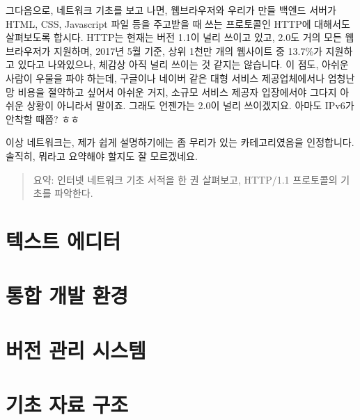 \documentclass[11pt,a4paper]{article}
\begin{document}
그다음으로, 네트워크 기초를 보고 나면, 웹브라우저와 우리가 만들 백엔드 서버가 HTML, CSS, Javascript 파일 등을 주고받을 때 쓰는 프로토콜인 HTTP에 대해서도 살펴보도록 합시다. HTTP는 현재는 버전 1.1이 널리 쓰이고 있고, 2.0도 거의 모든 웹브라우저가 지원하며, 2017년 5월 기준, 상위 1천만 개의 웹사이트 중 13.7\%가 지원하고 있다고 나와있으나, 체감상 아직 널리 쓰이는 것 같지는 않습니다. 이 점도, 아쉬운 사람이 우물을 파야 하는데, 구글이나 네이버 같은 대형 서비스 제공업체에서나 엄청난 망 비용을 절약하고 싶어서 아쉬운 거지, 소규모 서비스 제공자 입장에서야 그다지 아쉬운 상황이 아니라서 말이죠. 그래도 언젠가는 2.0이 널리 쓰이겠지요. 아마도 IPv6가 안착할 때쯤? ㅎㅎ

이상 네트워크는, 제가 쉽게 설명하기에는 좀 무리가 있는 카테고리였음을 인정합니다. 솔직히, 뭐라고 요약해야 할지도 잘 모르겠네요.

\begin{verse}
요약: 인터넷 네트워크 기초 서적을 한 권 살펴보고, HTTP/1.1 프로토콜의 기초를 파악한다.
\end{verse}

\section{텍스트 에디터}
\section{통합 개발 환경}
\section{버전 관리 시스템}
\section{기초 자료 구조}
\end{document}
